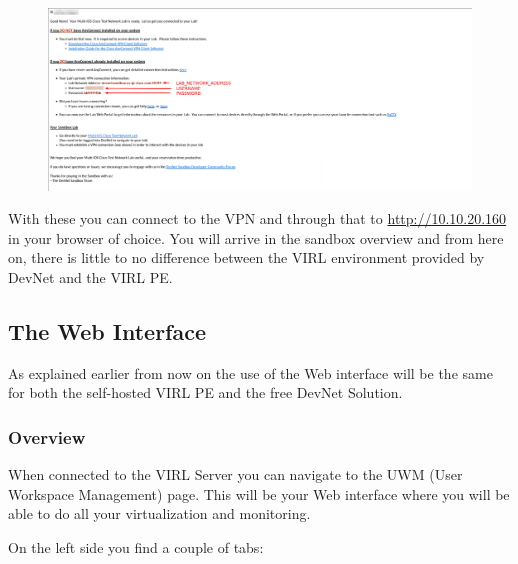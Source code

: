 \documentclass{article}
\begin{document}
\begin{figure}[H]
	\centering
	\includegraphics[width=\textwidth]{images/Second_mail.png}
\end{figure}

With these you can connect to the VPN and through that to \url{http://10.10.20.160} in your browser of choice.
You will arrive in the sandbox overview and from here on,
there is little to no difference between the VIRL environment provided by DevNet and the VIRL PE.

\subsection{The Web Interface}
As explained earlier from now on the use of the Web interface will be the same for both the self-hosted VIRL PE and the free DevNet Solution.

\subsubsection{Overview}
When connected to the VIRL Server you can navigate to the UWM (User Workspace Management) page.
This will be your Web interface where you will be able to do all your virtualization and monitoring.

On the left side you find a couple of tabs:
\end{document}
